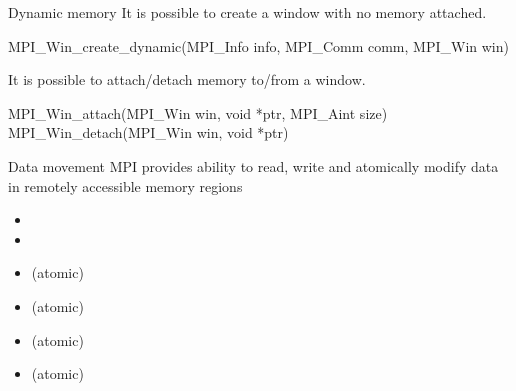 \documentclass[aspectratio=43]{beamer}
\begin{document}
\begin{frame}[fragile]{Dynamic memory}
It is possible to create a window with no memory attached.

\begin{Pseudolisting}[]{}
MPI_Win_create_dynamic(MPI_Info info, MPI_Comm comm,
                       MPI_Win win)
\end{Pseudolisting}

It is possible to attach/detach memory to/from a window.
\begin{Pseudolisting}[]{}
MPI_Win_attach(MPI_Win win, void *ptr, MPI_Aint size)
MPI_Win_detach(MPI_Win win, void *ptr)
\end{Pseudolisting}
\end{frame}

\begin{frame}[fragile]{Data movement}
MPI provides ability to read, write and atomically modify data in remotely accessible memory regions
\begin{itemize}
    \item {}
    \item {}
    \item {} (atomic)
    \item {} (atomic)
    \item {} (atomic)
    \item {} (atomic)
\end{itemize}
\end{frame}
\end{document}
